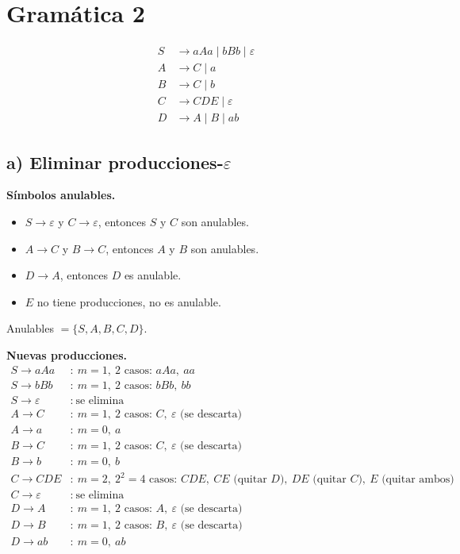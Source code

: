 \documentclass[11pt]{article}
\newcommand{\eps}{\varepsilon}
\begin{document}
\section*{Gram\'atica 2}
\begin{align*}
S &\to aAa \mid bBb \mid \eps\\
A &\to C \mid a\\
B &\to C \mid b\\
C &\to CDE \mid \eps\\
D &\to A \mid B \mid ab
\end{align*}

\subsection*{a) Eliminar producciones-$\eps$}

\textbf{S\'imbolos anulables.}
\begin{itemize}[nosep]
  \item $S \to \eps$ y $C \to \eps$, entonces $S$ y $C$ son anulables.
  \item $A \to C$ y $B \to C$, entonces $A$ y $B$ son anulables.
  \item $D \to A$, entonces $D$ es anulable.
  \item $E$ no tiene producciones, no es anulable.
\end{itemize}
Anulables $=\{S,A,B,C,D\}$.

\textbf{Nuevas producciones.}
\begin{align*}
S \to aAa  &:\ m=1,\ 2 \text{ casos: } aAa,\ aa\\
S \to bBb  &:\ m=1,\ 2 \text{ casos: } bBb,\ bb\\
S \to \eps &:\ \text{se elimina}\\
A \to C    &:\ m=1,\ 2 \text{ casos: } C,\ \eps \text{ (se descarta)}\\
A \to a    &:\ m=0,\ a\\
B \to C    &:\ m=1,\ 2 \text{ casos: } C,\ \eps \text{ (se descarta)}\\
B \to b    &:\ m=0,\ b\\
C \to CDE  &:\ m=2,\ 2^2=4 \text{ casos: } CDE,\ CE \text{ (quitar } D),\ DE \text{ (quitar } C),\ E \text{ (quitar ambos)}\\
C \to \eps &:\ \text{se elimina}\\
D \to A    &:\ m=1,\ 2 \text{ casos: } A,\ \eps \text{ (se descarta)}\\
D \to B    &:\ m=1,\ 2 \text{ casos: } B,\ \eps \text{ (se descarta)}\\
D \to ab   &:\ m=0,\ ab
\end{align*}
\end{document}
